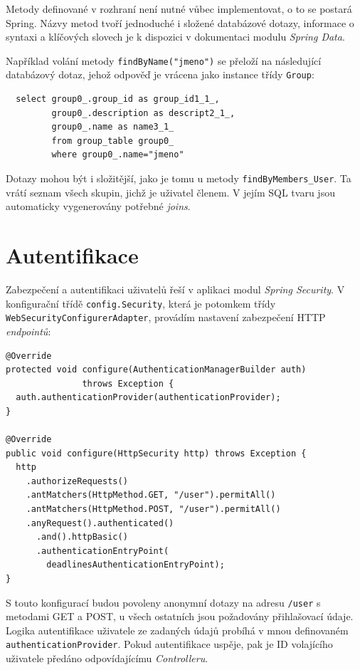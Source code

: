 \documentclass[thesis=B,czech]{FITthesis}[2012/06/26]
\begin{document}
	Metody definované v rozhraní není nutné vůbec implementovat, o to se postará Spring. Názvy metod tvoří jednoduché i složené databázové dotazy, informace o syntaxi a klíčových slovech je k dispozici v dokumentaci modulu \textit{Spring Data}. \cite{dao-query-methods}
	
	Například volání metody \texttt{findByName("jmeno")} se přeloží na následující databázový dotaz, jehož odpověď je vrácena jako instance třídy \texttt{Group}:
	\begin{Verbatim}
  select group0_.group_id as group_id1_1_, 
         group0_.description as descript2_1_, 
         group0_.name as name3_1_ 
         from group_table group0_ 
         where group0_.name="jmeno"
	\end{Verbatim}
	
	Dotazy mohou být i složitější, jako je tomu u metody \texttt{findByMembers\_User}. Ta vrátí seznam všech skupin, jichž je uživatel členem. V jejím  SQL tvaru jsou automaticky vygenerovány potřebné \textit{joins}.
	
	\section{Autentifikace}
		Zabezpečení a autentifikaci uživatelů řeší v aplikaci modul \textit{Spring Security}. \cite{spring-security} V konfigurační třídě \texttt{config.Security}, která je potomkem třídy \texttt{WebSecurityConfigurerAdapter}, provádím nastavení zabezpečení HTTP \textit{endpointů}:
		\begin{Verbatim}
@Override
protected void configure(AuthenticationManagerBuilder auth) 
               throws Exception {
  auth.authenticationProvider(authenticationProvider);
}
		
@Override
public void configure(HttpSecurity http) throws Exception {
  http
    .authorizeRequests()
    .antMatchers(HttpMethod.GET, "/user").permitAll()
    .antMatchers(HttpMethod.POST, "/user").permitAll()
    .anyRequest().authenticated()
      .and().httpBasic()
      .authenticationEntryPoint(
        deadlinesAuthenticationEntryPoint);
}
		\end{Verbatim}
	
		S touto konfigurací budou povoleny anonymní dotazy na adresu \texttt{/user} s metodami GET a POST, u všech ostatních jsou požadovány přihlašovací údaje. Logika autentifikace uživatele ze zadaných údajů probíhá v mnou definovaném \texttt{authenticationProvider}. Pokud autentifikace uspěje, pak je ID volajícího uživatele předáno odpovídajícímu \textit{Controlleru}.
	
\end{document}
